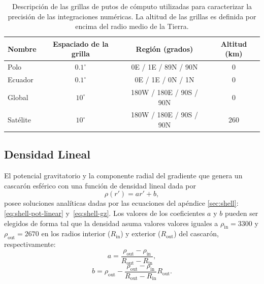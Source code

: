\begin{table}
\centering
\begin{tabular}{lccc}
    Nombre & Espaciado de la grilla & Región (grados) & Altitud (km)
    \\ \hline
    Polo      & $0.1^\circ$ &   0E /   1E / 89N / 90N & 0   \\
    Ecuador   & $0.1^\circ$ &   0E /   1E /  0N / 1N  & 0   \\
    Global    & $ 10^\circ$ & 180W / 180E / 90S / 90N & 0   \\
    Satélite  & $ 10^\circ$ & 180W / 180E / 90S / 90N & 260 \\
\end{tabular}
\caption{
    Descripción de las grillas de putos de cómputo utilizadas para caracterizar
    la precisión de las integraciones numéricas.
    La altitud de las grillas es definida por encima del radio medio de la
    Tierra.
    \newline
}
\label{tab:grids}
\end{table}


\subsection{Densidad Lineal}

El potencial gravitatorio y la componente radial del gradiente que genera un
cascarón esférico con una función de densidad lineal dada por
%
\begin{equation}
    \rho(r') = ar' + b,
    \label{eq:density-linear}
\end{equation}
%
posee soluciones analíticas dadas por las ecuaciones del apéndice
\ref{sec:shell}: \ref{eq:shell-pot-linear} y~\ref{eq:shell-gz}.
Los valores de los coeficientes $a$ y $b$ pueden ser elegidos de forma tal que
la densidad asuma valores valores iguales a  $\rho_\text{in}
= 3300$\kgpercubicm{} y $\rho_\text{out} = 2670$\kgpercubicm{} en los radios
interior ($R_\text{in}$) y exterior ($R_\text{out}$) del cascarón,
respectivamente:
%
\begin{equation}
    a = \frac{\rho_\text{out} - \rho_\text{in}}{R_\text{out} - R_\text{in}},
\end{equation}
%
\begin{equation}
    b = \rho_\text{out} -
    \frac{
        \rho_\text{out} - \rho_\text{in}
    }{
        R_\text{out} - R_\text{in}
    } R_\text{out}.
\end{equation}


